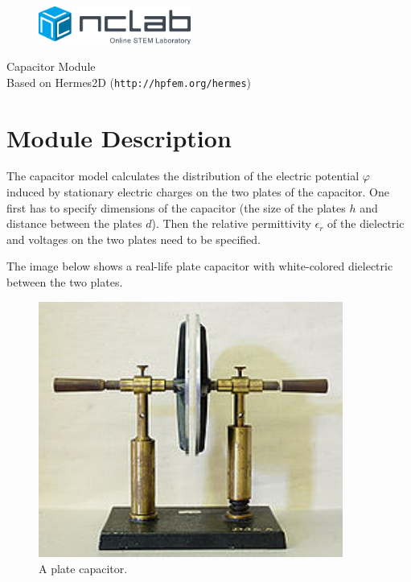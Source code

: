 \documentclass{article}
\begin{document}
\large

\vbox{}
\vspace{-2cm}
\begin{figure}[!ht]
\includegraphics[width=5cm]{img/logo.png}
\vspace{4mm}
\end{figure}
\noindent
\begin{center}
{\Huge Capacitor Module}\\[2mm]
Based on Hermes2D ({\tt http://hpfem.org/hermes})\\[6mm]
\end{center}
\section{Module Description}

The capacitor model calculates the distribution of the electric 
potential $\varphi$ induced by stationary electric charges on the two plates of the capacitor.
One first has to specify dimensions of the capacitor (the size of the plates $h$ and distance between the plates $d$).
Then the relative permittivity $\epsilon_r$ of the dielectric and voltages on the two plates need to be specified.

The image below shows a real-life plate capacitor with white-colored dielectric between the two plates.
 

\begin{figure}[!ht]
\begin{center}
\includegraphics[width=10cm]{img/capacitor.png}
\caption{A plate capacitor.}
\vspace{4mm}
\end{center}
\end{figure}
\noindent
\end{document}
